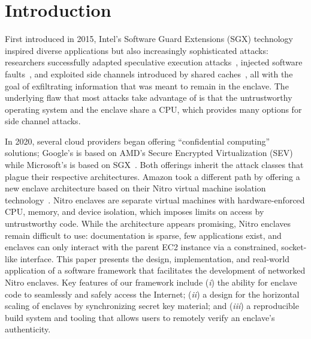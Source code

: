 \section{Introduction}

First introduced in 2015, Intel's Software Guard Extensions (SGX) technology
inspired diverse applications but also increasingly sophisticated attacks:
researchers successfully adapted speculative execution
attacks~\cite{VanBulck2018a}, injected software faults~\cite{Murdock2020a}, and
exploited side channels introduced by shared caches~\cite{Brasser2017a}, all
with the goal of exfiltrating information that was meant to remain in the
enclave.  The underlying flaw that most attacks take advantage of is that the
untrustworthy operating system and the enclave share a CPU, which provides many
options for side channel attacks.

In 2020, several cloud providers began offering ``confidential computing''
solutions; Google's is based on AMD's Secure Encrypted Virtualization
(SEV)~\cite{googlecc} while Microsoft's is based on SGX~\cite{azurecc}.  Both
offerings inherit the attack classes that plague their respective architectures.
Amazon took a different path by offering a new enclave architecture
based on their Nitro virtual machine isolation technology~\cite{nitro-enclaves}.
Nitro enclaves are separate virtual machines with hardware-enforced CPU,
memory, and device isolation, which imposes limits on access by untrustworthy code.
While the architecture appears promising, Nitro enclaves
remain difficult to use: documentation is sparse, few applications exist, and
enclaves can only interact with the parent EC2 instance via a constrained,
socket-like interface.  This paper presents the design, implementation, and
real-world application of a software framework that facilitates the development
of networked Nitro enclaves.  Key features of our framework include
(\emph{i}) the ability for enclave code to seamlessly and safely access the
Internet;
(\emph{ii}) a design for the horizontal scaling of enclaves by synchronizing
secret key material; and
(\emph{iii}) a reproducible build system and tooling that allows users to
remotely verify an enclave's authenticity.


